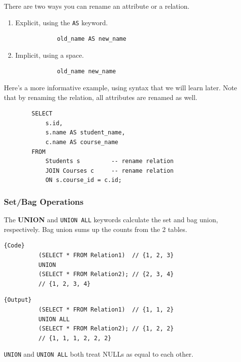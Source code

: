     \begin{definition}[Renaming]
      There are two ways you can rename an attribute or a relation. 
      \begin{enumerate}
        \item Explicit, using the \texttt{AS} keyword. 
          \begin{lstlisting}
            old_name AS new_name
          \end{lstlisting}
        \item Implicit, using a space. 
          \begin{lstlisting}
            old_name new_name
          \end{lstlisting}
      \end{enumerate}
    \end{definition}

    \begin{example}
      Here's a more informative example, using syntax that we will learn later. Note that by renaming the relation, all attributes are renamed as well. 
      \begin{lstlisting}
        SELECT
            s.id, 
            s.name AS student_name,
            c.name AS course_name
        FROM 
            Students s         -- rename relation
            JOIN Courses c     -- rename relation
            ON s.course_id = c.id; 
      \end{lstlisting}
    \end{example}

  \subsubsection{Set/Bag Operations}

    \begin{definition}[Union]
      The \textbf{UNION} and \texttt{UNION ALL} keywords calculate the set and bag union, respectively. Bag union sums up the counts from the 2 tables. 

      \noindent\begin{minipage}{.5\textwidth}
        \begin{lstlisting}[]{Code}
          (SELECT * FROM Relation1)  // {1, 2, 3}
          UNION 
          (SELECT * FROM Relation2); // {2, 3, 4}
          // {1, 2, 3, 4}
        \end{lstlisting}
        \end{minipage}
        \hfill
        \begin{minipage}{.49\textwidth}
        \begin{lstlisting}[]{Output}
          (SELECT * FROM Relation1)  // {1, 1, 2}
          UNION ALL 
          (SELECT * FROM Relation2); // {1, 2, 2}
          // {1, 1, 1, 2, 2, 2}
        \end{lstlisting}
      \end{minipage} 
      \texttt{UNION} and \texttt{UNION ALL} both treat NULLs as equal to each other. 
    \end{definition} 

